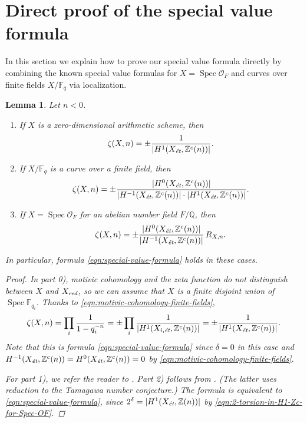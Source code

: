 \documentclass[draft]{article}
\DeclareMathOperator{\Spec}{Spec}
\newcommand{\FF}{\mathbb{F}}
\newcommand{\QQ}{\mathbb{Q}}
\newcommand{\ZZ}{\mathbb{Z}}
\newcommand{\et}{\text{\it \'{e}t}}
\newcommand{\red}{\text{\it red}}
\theoremstyle{myplain}
\newtheorem{lemma}[theorem]{Lemma}
\theoremstyle{mydefinition}
\begin{document}

\section{Direct proof of the special value formula}
\label{sec:direct-proof}

In this section we explain how to prove our special value formula directly by
combining the known special value formulas for $X = \Spec \mathcal{O}_F$ and
curves over finite fields $X/\FF_q$ via localization.

\begin{lemma}
  \label{lemma:elementary-proof-1}
  Let $n < 0$.

  \begin{enumerate}
  \item[0)] If $X$ is a zero-dimensional arithmetic scheme, then
    $$\zeta (X,n) = \pm \frac{1}{|H^1 (X_\et, \ZZ^c (n))|}.$$

  \item[1)] If $X/\FF_q$ is a curve over a finite field, then
    \[ \zeta (X,n) =
      \pm\frac{|H^0 (X_\et, \ZZ^c(n))|}{|H^{-1} (X_\et, \ZZ^c(n))|\cdot |H^1 (X_\et, \ZZ^c(n))|}. \]

  \item[2)] If $X = \Spec \mathcal{O}_F$ for an abelian number field $F/\QQ$,
    then
    \[ \zeta (X,n) = \pm\frac{|H^0 (X_\et, \ZZ^c(n))|}{|H^{-1} (X_\et, \ZZ^c(n))|}\,R_{X,n}. \]
  \end{enumerate}

  In particular, formula \eqref{eqn:special-value-formula} holds in these
  cases.

  \begin{proof}
    In part 0), motivic cohomology and the zeta function do not distinguish
    between $X$ and $X_\red$, so we can assume that $X$ is a finite   
    disjoint union of $\Spec \FF_{q_i}$. Thanks to
    \eqref{eqn:motivic-cohomology-finite-fields},
    \[ \zeta (X,n) = \prod_i \frac{1}{1 - q_i^{-n}} =
      \pm \prod_i \frac{1}{|H^1 (X_{i,\et}, \ZZ^c (n))|} =
      \pm \frac{1}{|H^1 (X_\et, \ZZ^c (n))|}. \]
    Note that this is formula \eqref{eqn:special-value-formula}
    since $\delta = 0$ in this case and
    $H^{-1} (X_\et, \ZZ^c (n)) = H^0 (X_\et, \ZZ^c (n)) = 0$ by
    \eqref{eqn:motivic-cohomology-finite-fields}.

    \vspace{1em}

    For part 1), we refer the reader to \cite[\S 5]{Beshenov-Weil-etale-2}.
    Part 2) follows from \cite[Proposition~5.35]{Flach-Morin-2018}.
    (The latter uses reduction to the Tamagawa number conjecture.)
    The formula is equivalent to \eqref{eqn:special-value-formula}, since
    $2^\delta = |H^1 (X_\et, \ZZ (n))|$ by
    \eqref{eqn:2-torsion-in-H1-Zc-for-Spec-OF}.
  \end{proof}
\end{lemma}
\end{document}
